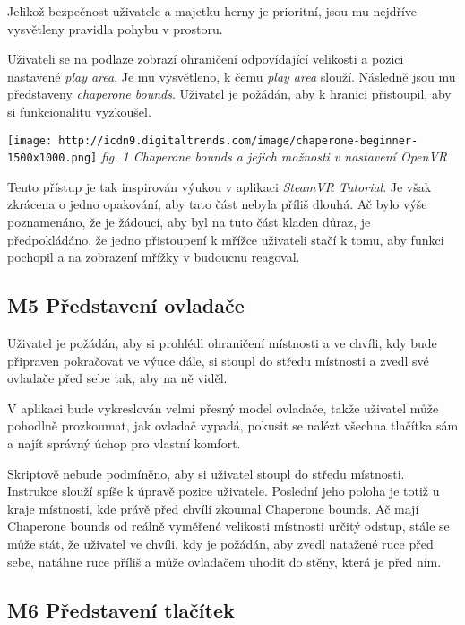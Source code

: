 Jelikož bezpečnost uživatele a majetku herny je prioritní, jsou mu nejdříve
vysvětleny pravidla pohybu v prostoru.

Uživateli se na podlaze zobrazí ohraničení odpovídající velikosti a
pozici nastavené \emph{play area}. Je mu vysvětleno, k čemu \emph{play
area} slouží. Následně jsou mu představeny \emph{chaperone bounds}.
Uživatel je požádán, aby k hranici přistoupil, aby si funkcionalitu
vyzkoušel.

\texttt{[image: http://icdn9.digitaltrends.com/image/chaperone-beginner-1500x1000.png]}
\emph{fig. 1 Chaperone bounds a jejich možnosti v nastavení OpenVR}

Tento přístup je tak inspirován výukou v aplikaci \emph{SteamVR
Tutorial}. Je však zkrácena o jedno opakování, aby tato část nebyla
příliš dlouhá. Ač bylo výše poznamenáno, že je žádoucí, aby byl na tuto
část kladen důraz, je předpokládáno, že jedno přistoupení k mřížce uživateli
stačí k tomu, aby funkci pochopil a na zobrazení mřížky v budoucnu
reagoval.

\subsection{M5 Představení
ovladače}\label{m5-pux159edstavenuxed-ovladaux10de}

Uživatel je požádán, aby si prohlédl ohraničení místnosti a ve chvíli,
kdy bude připraven pokračovat ve výuce dále, si stoupl do středu
místnosti a zvedl své ovladače před sebe tak, aby na ně viděl.

V aplikaci bude vykreslován velmi přesný model ovladače, takže uživatel
může pohodlně prozkoumat, jak ovladač vypadá, pokusit se nalézt všechna
tlačítka sám a najít správný úchop pro vlastní komfort.

Skriptově nebude podmíněno, aby si uživatel stoupl do středu místnosti.
Instrukce slouží spíše k úpravě pozice uživatele. Poslední jeho poloha
je totiž u kraje místnosti, kde právě před chvílí zkoumal Chaperone
bounds. Ač mají Chaperone bounds od reálně vyměřené velikosti místnosti
určitý odstup, stále se může stát, že uživatel ve chvíli, kdy je
požádán, aby zvedl natažené ruce před sebe, natáhne ruce příliš a může
ovladačem uhodit do stěny, která je před ním.

\subsection{M6 Představení
tlačítek}\label{m6-pux159edstavenuxed-tlaux10duxedtek}

